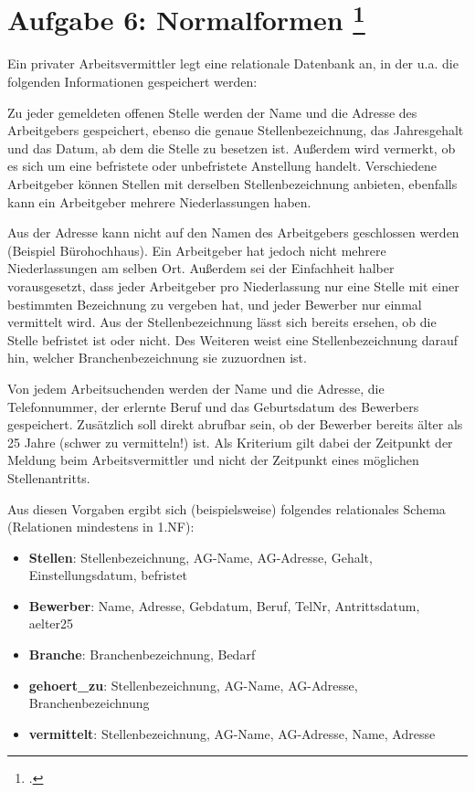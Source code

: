 \documentclass{lehramt-informatik-aufgabe}
\begin{document}
\let\m=\liMenge


\section{Aufgabe 6: Normalformen
\footcite{db:ab:7}}

Ein privater Arbeitsvermittler legt eine relationale Datenbank an, in
der u.a. die folgenden Informationen gespeichert werden:

Zu jeder gemeldeten offenen Stelle werden der Name und die Adresse des
Arbeitgebers gespeichert, ebenso die genaue Stellenbezeichnung, das
Jahresgehalt und das Datum, ab dem die Stelle zu besetzen ist. Außerdem
wird vermerkt, ob es sich um eine befristete oder unbefristete
Anstellung handelt. Verschiedene Arbeitgeber können Stellen mit
derselben Stellenbezeichnung anbieten, ebenfalls kann ein Arbeitgeber
mehrere Niederlassungen haben.

Aus der Adresse kann nicht auf den Namen des Arbeitgebers geschlossen
werden (Beispiel Bürohochhaus). Ein Arbeitgeber hat jedoch nicht mehrere
Niederlassungen am selben Ort. Außerdem sei der Einfachheit halber
vorausgesetzt, dass jeder Arbeitgeber pro Niederlassung nur eine Stelle
mit einer bestimmten Bezeichnung zu vergeben hat, und jeder Bewerber nur
einmal vermittelt wird. Aus der Stellenbezeichnung lässt sich bereits
ersehen, ob die Stelle befristet ist oder nicht. Des Weiteren weist eine
Stellenbezeichnung darauf hin, welcher Branchenbezeichnung sie
zuzuordnen ist.

Von jedem Arbeitsuchenden werden der Name und die Adresse, die
Telefonnummer, der erlernte Beruf und das Geburtsdatum des Bewerbers
gespeichert. Zusätzlich soll direkt abrufbar sein, ob der Bewerber
bereits älter als 25 Jahre (schwer zu vermitteln!) ist. Als Kriterium
gilt dabei der Zeitpunkt der Meldung beim Arbeitsvermittler und nicht
der Zeitpunkt eines möglichen Stellenantritts.

Aus diesen Vorgaben ergibt sich (beispielsweise) folgendes relationales
Schema (Relationen mindestens in 1.NF):

\begin{itemize}
\item \textbf{Stellen}: Stellenbezeichnung, AG-Name, AG-Adresse, Gehalt,
Einstellungsdatum, befristet

\item \textbf{Bewerber}: Name, Adresse, Gebdatum, Beruf, TelNr,
Antrittsdatum, aelter25

\item \textbf{Branche}: Branchenbezeichnung, Bedarf

\item \textbf{gehoert\_zu}: Stellenbezeichnung, AG-Name, AG-Adresse,
Branchenbezeichnung

\item \textbf{vermittelt}: Stellenbezeichnung, AG-Name, AG-Adresse,
Name, Adresse
\end{itemize}
\end{document}
